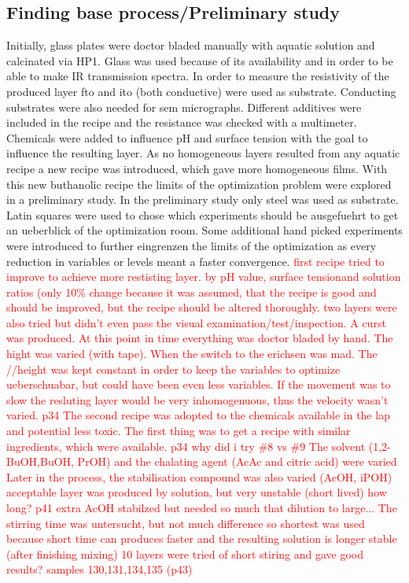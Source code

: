 \documentclass[a4paper]{article}
\newcommand{\td}[1]{\textcolor{red}{#1}}
\begin{document}
\subsection{Finding base process/Preliminary study}
Initially, glass plates were doctor bladed manually with aquatic solution and calcinated via HP1. 
Glass was used because of its availability and in order to be able to make IR transmission spectra.
In order to measure the resistivity of the produced layer \gls{fto} and \gls{ito} (both conductive) were used as substrate.
Conducting substrates were also needed for \gls{sem} micrographs. 
Different additives were included in the recipe and the resistance was checked with a multimeter. 
Chemicals were added to influence pH and surface tension with the goal to influence the resulting layer. 
As no homogeneous layers resulted from any aquatic recipe a new recipe was introduced, which gave more homogeneous films.
With this new buthanolic recipe the limits of the optimization problem were explored in a preliminary study.
In the preliminary study only steel was used as substrate.
Latin squares were used to chose which experiments should be ausgefuehrt to get an ueberblick of the optimization room.
Some additional hand picked experiments were introduced to further eingrenzen the limits of the optimization as every reduction in variables or levels meant a faster convergence.
\td{first recipe tried to improve to achieve more restisting layer. by pH value, surface tensionand solution ratios (only 10\% change because it was assumed, that the recipe is good and should be improved, but the recipe should be altered thoroughly.
two layers were also tried but didn't even pass the visual examination/test/inspection. 
A curst was produced. 
At this point in time everything was doctor bladed by hand. The hight was varied (with tape).
When the switch to the erichsen was mad. The //height was kept constant in order to keep 
the variables to optimize ueberschuabar, but could have been even less variables.
If the movement was to slow the resluting  layer would be very inhomogenuous, thus the
velocity wasn't varied.
p34
The second recipe was adopted to the chemicals available in the lap and potential less toxic.
The first thing was to get a recipe with similar ingredients, which were available. 
p34 why did i try \#8 vs \#9 
The solvent (1,2-BuOH,BuOH, PrOH) and the chalating agent (AcAc and citric acid) were varied 
Later in the process, the stabilisation compound was also varied (AcOH, iPOH)
acceptable layer was produced by solution, but very unstable (short lived) how long? p41 
extra AcOH stabilzed but needed so much that dilution to large...
The stirring time was untersucht, but not much difference so shortest was used because 
short time can produces faster and the resulting solution is longer stable 
(after finishing mixing)
10 layers were tried of short stiring and gave good results? samples 130,131,134,135 (p43)
}
\end{document}
